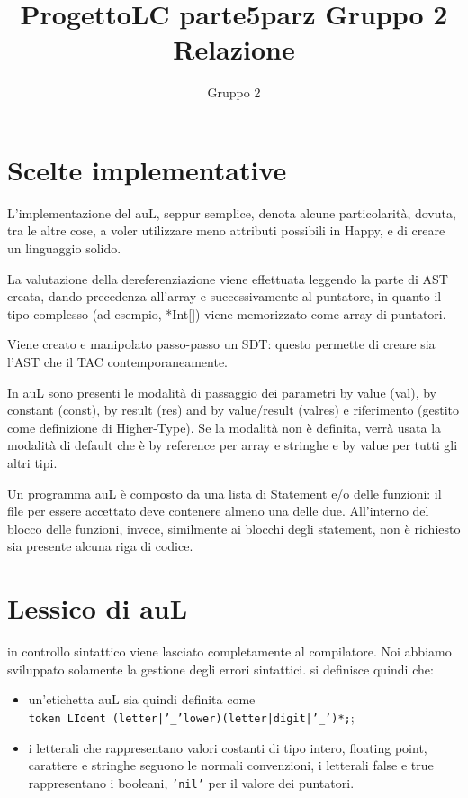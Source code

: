 \documentclass{article}
\title{ProgettoLC parte5parz Gruppo 2 Relazione}
\author{Gruppo 2 }
\begin{document}


\printindex


\setcounter{page}{1}

\section{Scelte implementative}
L'implementazione del auL, seppur semplice, denota alcune particolarità, dovuta, tra le altre cose, a voler utilizzare
meno attributi possibili in Happy, e di creare un linguaggio solido.

La valutazione della dereferenziazione viene effettuata leggendo la parte di AST creata, dando precedenza all'array
e successivamente al puntatore, in quanto il tipo complesso (ad esempio, *Int[]) viene memorizzato come array di
puntatori.

Viene creato e manipolato passo-passo un SDT: questo permette di creare sia l'AST che il TAC contemporaneamente.

In auL sono presenti le modalità di passaggio dei parametri by value (val), by constant (const), by 
result (res) and by value/result (valres) e riferimento (gestito come definizione di Higher-Type). 
Se la modalità non è definita, verrà usata la modalità di default che è by reference per array e stringhe 
e by value per tutti gli altri tipi.

Un programma auL è composto da una lista di Statement e/o delle funzioni: il file per essere accettato deve contenere
almeno una delle due. All'interno del blocco delle funzioni, invece, similmente ai blocchi degli statement, non è richiesto
sia presente alcuna riga di codice.

\section{Lessico di auL}
in controllo sintattico viene lasciato completamente al compilatore. Noi abbiamo sviluppato solamente la gestione
degli errori sintattici. si definisce quindi che:
\begin{itemize}
	\item un'etichetta auL sia quindi definita come\\
		\texttt{token LIdent (letter|'\_'lower)(letter|digit|'\_')*;};
	
	\item i letterali che rappresentano valori costanti di tipo intero, floating point, carattere e stringhe 
	seguono le normali convenzioni, i letterali false e true rappresentano i booleani, \texttt{'nil'} per il valore
	dei puntatori.
\end{itemize}
\end{document}
